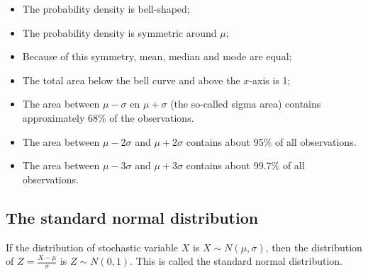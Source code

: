 \begin{itemize}
  \item The probability density is bell-shaped;
  \item The probability density is symmetric around $\mu$;
  \item Because of this symmetry, mean, median and mode are equal;
  \item The total area below the bell curve and above the $x$-axis is 1;
  \item The area between $\mu - \sigma$ en $\mu + \sigma$ (the so-called sigma area) contains approximately 68\% of the observations.
  \item The area between $\mu - 2 \sigma$ and $\mu + 2 \sigma$ contains about 95\% of all observations.
  \item The area between $\mu - 3 \sigma$ and $\mu + 3 \sigma$ contains about 99.7\% of all observations.
\end{itemize}

\subsection{The standard normal distribution}
\label{ssec:standard-normal-distribution}

If the distribution of stochastic variable $X$ is $X \sim N(\mu, \sigma)$, then the distribution of $Z = \frac{X - \mu}{\sigma}$ is $Z \sim N(0,1)$. This is called the standard normal distribution.

